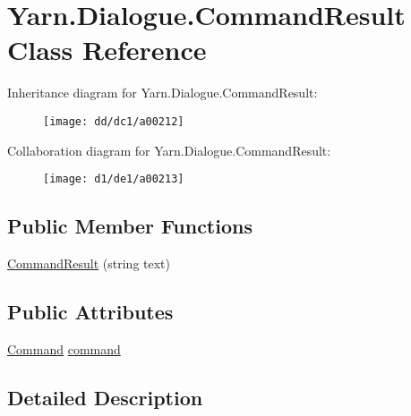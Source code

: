 \hypertarget{a00027}{\section{Yarn.\-Dialogue.\-Command\-Result Class Reference}
\label{a00027}
}


Inheritance diagram for Yarn.\-Dialogue.\-Command\-Result\-:
\nopagebreak
\begin{figure}[H]
\begin{center}
\leavevmode
\texttt{[image: dd/dc1/a00212]}
\end{center}
\end{figure}


Collaboration diagram for Yarn.\-Dialogue.\-Command\-Result\-:
\nopagebreak
\begin{figure}[H]
\begin{center}
\leavevmode
\texttt{[image: d1/de1/a00213]}
\end{center}
\end{figure}
\subsection*{Public Member Functions}
\begin{DoxyCompactItemize}
\item 
\hyperlink{a00027_a1a553422394fb0c854d1184985f993bb}{Command\-Result} (string text)
\end{DoxyCompactItemize}
\subsection*{Public Attributes}
\begin{DoxyCompactItemize}
\item 
\hyperlink{a00026_d6/db8/a00158}{Command} \hyperlink{a00027_a420ca0984d6e5c33bb761654305c592e}{command}
\end{DoxyCompactItemize}


\subsection{Detailed Description}


